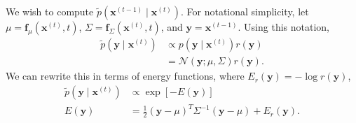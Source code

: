 \documentclass{article}
\newcommand{\mb}{\mathbf}
\newcommand{\mc}{\mathcal}
\begin{document}
We wish to compute $\tilde{p}\left( \mb x^{(t-1)} \mid \mb x^{(t)} \right)$. For notational simplicity, let $\mu = \mb f_\mu\left( \mb x^{(t)}, t \right)$, $\Sigma = \mb f_\Sigma\left( \mb x^{(t)}, t \right)$, and $\mb y = \mb x^{(t-1)}$. Using this notation,
\begin{align}
\tilde{p}\left( \mb y \mid \mb x^{(t)} \right)
&\propto 
	p\left( \mb y \mid \mb x^{(t)} \right)
	r\left( \mb y \right) \\
&=	\mc N \left( \mb y ;\mu, \Sigma \right)
	r\left( \mb y \right)
.
\end{align}
We can rewrite this in terms of energy functions, where $E_r\left( \mb y \right) = -\log r\left( \mb y \right)$,
\begin{align}
\tilde{p}\left( \mb y \mid \mb x^{(t)} \right)
&\propto
	\exp\left[
		-E\left( \mb y \right) 
	\right] \\
E\left( \mb y \right) &=\frac{1}{2} \left( \mb y - \mu \right)^T \Sigma^{-1} \left( \mb y - \mu \right) +  E_r\left( \mb y \right)
.
\end{align}
\end{document}
